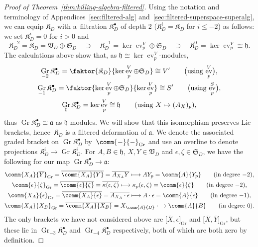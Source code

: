 \documentclass[pdftex]{sigma}
\numberwithin{equation}{section}
\newcommand{\fa}{\mathfrak{a}}
\newcommand{\fh}{\mathfrak{h}}
\newcommand{\fK}{\mathfrak{K}}
\newcommand{\fS}{\mathfrak{S}}
\newcommand{\fV}{\mathfrak{V}}
\newcommand{\1}{\mathbbm{1}}
\DeclareMathOperator{\Gr}{Gr}
\DeclareMathOperator{\evaluate}{ev}
\begin{document}
\begin{proof}[Proof of Theorem~\ref{thm:killing-algebra-filtered}]
	Using the notation and terminology of Appendices~\ref{sec:filtered-alg} and~\ref{sec:filtered-superspace-superalg}, we can equip $\fK_D$ with a~filtration $\fK_D^\bullet$ of depth 2 ($\fK_D^i = \fK_D$ for $i\leq-2$) as follows: we set $\fK_D^i = 0$ for $i>0$ and
	\[
		\fK_D^{-2}=\fK_D = \fV_D\oplus\fS_D \quad \supset \quad
		\fK_D^{-1} = \ker\evaluate^V_p\oplus \fS_D \quad \supset \quad
		\fK_D^0 = \ker\evaluate^V_p\cong \fh.
	\]
	The calculations above show that, as $\fh\cong\ker\evaluate^V_p$-modules,
	\begin{gather*}
		\Gr_{-2}\fK_D^\bullet = \faktor{\fK_D}{\ker\evaluate^V_p\oplus\fS_D} \cong V' \qquad \text{\big(using $\evaluate^V_p$\big)},	\\
		\Gr_{-1}\fK_D^\bullet = \faktor{\ker\evaluate^V_p\oplus\fS_D}{\ker\evaluate^V_p} \cong S'	\qquad \text{\big(using $\evaluate^{S}_p$\big)},	\\
		\Gr_0 \fK_D^\bullet = \ker\evaluate^V_p \cong \fh \qquad\text{(using $X\mapsto (A_X)_p$)},
	\end{gather*}
	thus $\Gr\fK_D^\bullet\cong\fa$ as $\fh$-modules. We will show that this isomorphism preserves Lie brackets, hence~$\fK_D$ is a filtered deformation of $\fa$. We denote the associated graded bracket on $\Gr\fK_D^\bullet$ by~$\comm{-}{-}_{\mathrm{Gr}}$ and use an overline to denote projections $\fK_D^i\to\Gr\fK_D^i$. For $A,B\in\fh$, $X,Y\in\fV_D$ and $\epsilon,\zeta\in\fS_D$, we have the following for our map $\Gr\fK_D^\bullet\to\fa$:
	\begin{gather*}
		\comm{X_A}{\overline{Y}}_{\mathrm{Gr}} = \overline{\comm{X_A}{Y}} = \overline{A_{X_A}Y}
			 \longmapsto 	 A Y_p = \comm{A}{Y_p}	\qquad (\text{in degree $-2$}),	\\
		\comm{\epsilon}{\zeta}_{\mathrm{Gr}} = \overline{\comm{\epsilon}{\zeta}} = \overline{\kappa(\epsilon,\zeta)}
			 \longmapsto 	 \kappa_p(\epsilon,\zeta) = \comm{\epsilon}{\zeta}	\qquad (\text{in degree $-2$}),	\\
		\comm{X_A}{\epsilon}_{\mathrm{Gr}} = \overline{\comm{X_A}{\epsilon}} = \overline{A_{X_A}\cdot\epsilon}
			 \longmapsto 	 A\cdot \epsilon = \comm{A}{\epsilon}	\qquad (\text{in degree $-1$}),	\\
		\comm{X_A}{X_B}_{\mathrm{Gr}} = \overline{\comm{X_A}{X_B}} = X_{\comm{A}{B}}
		 \longmapsto 	 \comm{A}{B}	\qquad (\text{in degree $0$}).
	\end{gather*}
	The only brackets we have not considered above are $\big[\overline{X},\epsilon\big]_{\mathrm{Gr}}$ and $\big[\overline{X},\overline{Y}\big]_{\mathrm{Gr}}$, but these lie in $\Gr_{-3}\fK_D^\bullet$ and $\Gr_{-4}\fK_D^\bullet$ respectively, both of which are both zero by definition.
	\end{proof}
	
\end{document}
